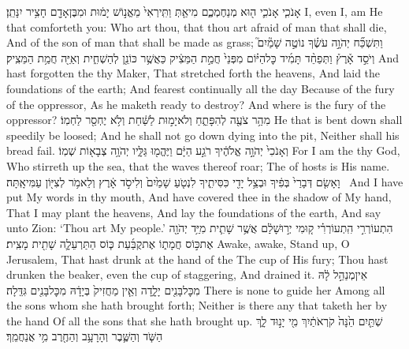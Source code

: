 \newperek
{}
\label{haft_48}
\setcounter{chap}{51}
\setcounter{verse}{12}
{אָנֹכִ֧י אָנֹכִ֛י ה֖וּא מְנַחֶמְכֶ֑ם מִי\maqqaf אַ֤תְּ וַתִּֽירְאִי֙ מֵאֱנ֣וֹשׁ יָמ֔וּת וּמִבֶּן\maqqaf אָדָ֖ם חָצִ֥יר יִנָּתֵֽן׃}
{I, even I, am He that comforteth you: Who art thou, that thou art afraid of man that shall die, And of the son of man that shall be made as grass;}
{וַתִּשְׁכַּ֞ח יְהֹוָ֣ה עֹשֶׂ֗ךָ נוֹטֶ֣ה שָׁמַ֘יִם֮ וְיֹסֵ֣ד אָ֒רֶץ֒ וַתְּפַחֵ֨ד תָּמִ֜יד כׇּל\maqqaf הַיּ֗וֹם מִפְּנֵי֙ חֲמַ֣ת הַמֵּצִ֔יק כַּאֲשֶׁ֥ר כּוֹנֵ֖ן לְהַשְׁחִ֑ית וְאַיֵּ֖ה חֲמַ֥ת הַמֵּצִֽיק׃}
{And hast forgotten the \lord\space thy Maker, That stretched forth the heavens, And laid the foundations of the earth; And fearest continually all the day Because of the fury of the oppressor, As he maketh ready to destroy? And where is the fury of the oppressor?}
{מִהַ֥ר צֹעֶ֖ה לְהִפָּתֵ֑חַ וְלֹא\maqqaf יָמ֣וּת לַשַּׁ֔חַת וְלֹ֥א יֶחְסַ֖ר לַחְמֽוֹ׃}
{He that is bent down shall speedily be loosed; And he shall not go down dying into the pit, Neither shall his bread fail.}
{וְאָנֹכִי֙ יְהֹוָ֣ה אֱלֹהֶ֔יךָ רֹגַ֣ע הַיָּ֔ם וַיֶּהֱמ֖וּ גַּלָּ֑יו יְהֹוָ֥ה צְבָא֖וֹת שְׁמֽוֹ׃}
{For I am the \lord\space thy God, Who stirreth up the sea, that the waves thereof roar; The \lord\space of hosts is His name.}
{וָאָשִׂ֤ם דְּבָרַי֙ בְּפִ֔יךָ וּבְצֵ֥ל יָדִ֖י כִּסִּיתִ֑יךָ לִנְטֹ֤עַ שָׁמַ֙יִם֙ וְלִיסֹ֣ד אָ֔רֶץ וְלֵאמֹ֥ר לְצִיּ֖וֹן עַמִּי\maqqaf אָֽתָּה׃ \setuma }
{And I have put My words in thy mouth, And have covered thee in the shadow of My hand, That I may plant the heavens, And lay the foundations of the earth, And say unto Zion: ‘Thou art My people.’}
{הִתְעוֹרְרִ֣י הִֽתְעוֹרְרִ֗י ק֚וּמִי יְר֣וּשָׁלַ֔͏ִם אֲשֶׁ֥ר שָׁתִ֛ית מִיַּ֥ד יְהֹוָ֖ה אֶת\maqqaf כּ֣וֹס חֲמָת֑וֹ אֶת\maqqaf קֻבַּ֜עַת כּ֧וֹס הַתַּרְעֵלָ֛ה שָׁתִ֖ית מָצִֽית׃}
{Awake, awake, Stand up, O Jerusalem, That hast drunk at the hand of the \lord\space The cup of His fury; Thou hast drunken the beaker, even the cup of staggering, And drained it.}
{אֵין\maqqaf מְנַהֵ֣ל לָ֔הּ מִכׇּל\maqqaf בָּנִ֖ים יָלָ֑דָה וְאֵ֤ין מַחֲזִיק֙ בְּיָדָ֔הּ מִכׇּל\maqqaf בָּנִ֖ים גִּדֵּֽלָה׃}
{There is none to guide her Among all the sons whom she hath brought forth; Neither is there any that taketh her by the hand Of all the sons that she hath brought up.}
{שְׁתַּ֤יִם הֵ֙נָּה֙ קֹרְאֹתַ֔יִךְ מִ֖י יָנ֣וּד לָ֑ךְ הַשֹּׁ֧ד וְהַשֶּׁ֛בֶר וְהָרָעָ֥ב וְהַחֶ֖רֶב מִ֥י אֲנַחֲמֵֽךְ׃}
